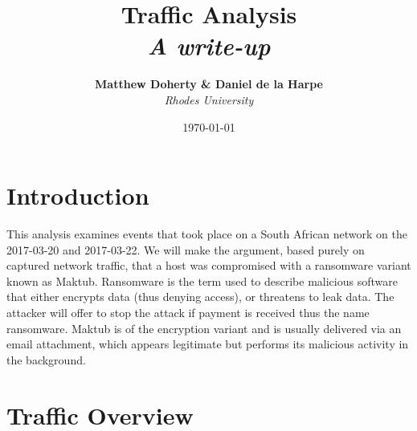 \documentclass[11pt]{diazessay} %
\title{\textbf{Traffic Analysis} \\ {\Large\itshape A write-up}} %
\author{\textbf{Matthew Doherty \& Daniel de la Harpe} \\ \textit{Rhodes University}} %
\date{\today} %
\begin{document}
\maketitle %



\renewcommand{\thesection}{\arabic{section}}
\renewcommand{\thesubsection}{\arabic{subsection}}
\renewcommand{\thesubsubsection}{\arabic{subsubsection}}
\renewcommand{\thesubsection}{\thesection.\arabic{subsection}}
\renewcommand{\thesubsubsection}{\thesubsection.\arabic{subsubsection}}

\vspace{30pt} %



\section*{Introduction}
This analysis examines events that took place on a South African network on the 2017-03-20 and 2017-03-22. We will make the argument, based purely on captured network traffic, that a host was compromised with a ransomware variant known as Maktub. Ransomware is the term used to describe malicious software that either encrypts data (thus denying access), or threatens to leak data. The attacker will offer to stop the attack if payment is received thus the name ransomware. Maktub is of the encryption variant and is usually delivered via an email attachment, which appears legitimate but performs its malicious activity in the background.




\section*{Traffic Overview}
\end{document}
